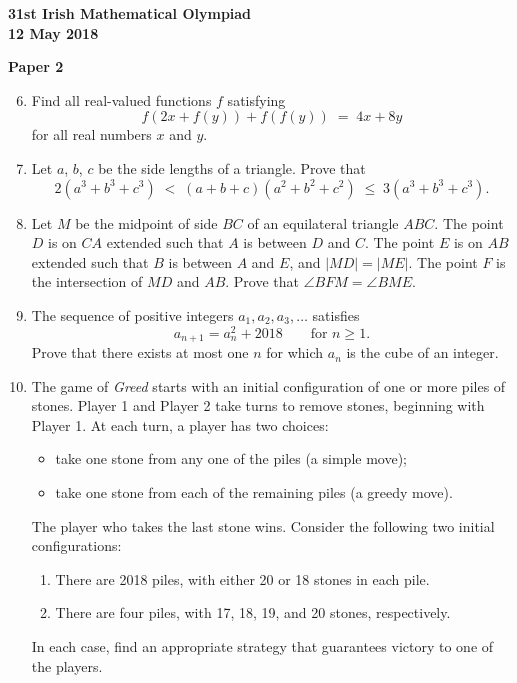 \documentclass[12pt]{article}
\begin{document}
\newpage
\begin{center}
{\large\bfseries 31st Irish Mathematical Olympiad\\12 May 2018}
\end{center}
\bigskip\noindent\textbf{Paper 2}\bigskip
\begin{enumerate}
\setcounter{enumi}{5}
\item Find all real-valued functions $f$ satisfying
\[
f(2x + f(y)) + f(f(y)) \;=\; 4x + 8y
\]
for all real numbers $x$ and $y$.

\item Let $a$, $b$, $c$ be the side lengths of a triangle. Prove that
\[
2(a^3 + b^3 + c^3) \;<\; (a + b + c)(a^2 + b^2 + c^2) \;\leq\; 3(a^3 + b^3 + c^3).
\]

\item Let $M$ be the midpoint of side $BC$ of an equilateral triangle $ABC$. The point $D$ is on $CA$ extended such that $A$ is between $D$ and $C$. The point $E$ is on $AB$ extended such that $B$ is between $A$ and $E$, and $|MD| = |ME|$. The point $F$ is the intersection of $MD$ and $AB$. Prove that $\angle BFM = \angle BME$.

\item The sequence of positive integers $a_1, a_2, a_3, \ldots$ satisfies
\[
a_{n+1} = a_n^2 + 2018 \qquad \text{for } n \geq 1.
\]
Prove that there exists at most one $n$ for which $a_n$ is the cube of an integer.

\item The game of \emph{Greed} starts with an initial configuration of one or more piles of stones. Player 1 and Player 2 take turns to remove stones, beginning with Player 1. At each turn, a player has two choices:
\begin{itemize}
\item take one stone from any one of the piles (a simple move);
\item take one stone from each of the remaining piles (a greedy move).
\end{itemize}
The player who takes the last stone wins. Consider the following two initial configurations:
\begin{enumerate}
\item[(a)] There are 2018 piles, with either 20 or 18 stones in each pile.
\item[(b)] There are four piles, with 17, 18, 19, and 20 stones, respectively.
\end{enumerate}
In each case, find an appropriate strategy that guarantees victory to one of the players.
\end{enumerate}
\end{document}
